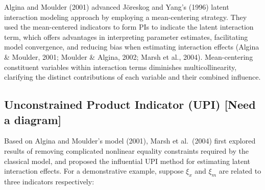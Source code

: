 \documentclass[
  man]{apa7}
\begin{document}
Algina and Moulder (2001) advanced Jöreskog and Yang's (1996) latent interaction modeling approach by employing a mean-centering strategy. They used the mean-centered indicators to form PIs to indicate the latent interaction term, which offers advantages in interpreting parameter estimates, facilitating model convergence, and reducing bias when estimating interaction effects (Algina \& Moulder, 2001; Moulder \& Algina, 2002; Marsh et al., 2004). Mean-centering constituent variables within interaction terms diminishes multicollinearity, clarifying the distinct contributions of each variable and their combined influence.

\hypertarget{unconstrained-product-indicator-upi-need-a-diagram}{%
\subsection{Unconstrained Product Indicator (UPI) {[}Need a diagram{]}}\label{unconstrained-product-indicator-upi-need-a-diagram}}

Based on Algina and Moulder's model (2001), Marsh et al.~(2004) first explored results of removing complicated nonlinear equality constraints required by the classical model, and proposed the influential UPI method for estimating latent interaction effects. For a demonstrative example, suppose \(\xi_{x}\) and \(\xi_{m}\) are related to three indicators respectively:
\end{document}
